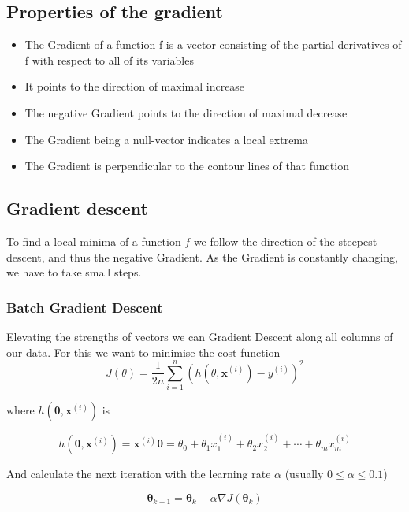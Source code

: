 \documentclass[11pt]{article}
\begin{document}
\subsection{Properties of the gradient}
\begin{itemize}
    \item The Gradient of a function f is a vector consisting of the partial derivatives of f with respect to all of its variables
    \item It points to the direction of maximal increase
    \item The negative Gradient points to the direction of maximal decrease
    \item The Gradient being a null-vector indicates a local extrema
    \item The Gradient is perpendicular to the contour lines of that function
\end{itemize}

\subsection{Gradient descent}
To find a local minima of a function $f$ we follow the direction of the steepest descent, and thus the negative Gradient. As the Gradient is constantly changing, we have to take small steps.

\subsubsection{Batch Gradient Descent}
Elevating the strengths of vectors we can Gradient Descent along all columns of our data. For this we want to minimise the cost function
\begin{equation}
    J(\theta) = \frac{1}{2n}\sum_{i=1}^{n}(h({\theta},\textbf{x}^{(i)})-y^{(i)})^2
\end{equation}

where $h(\bm{\theta},\textbf{x}^{(i)})$ is

\begin{equation}
    h(\bm{\theta},\bm{x}^{(i)}) = \bm{x}^{(i)}\bm{\theta} = \theta_0 + \theta_1 x^{(i)}_1 + \theta_2 x^{(i)}_2 + \cdots + \theta_m x^{(i)}_m
\end{equation}

And calculate the next iteration with the learning rate $\alpha$ (usually $0\leq\alpha\leq0.1$)

\begin{equation}
    \bm{\theta}_{k+1} = \bm{\theta}_{k} -\alpha\nabla J(\bm{\theta}_k)
\end{equation}
\end{document}
